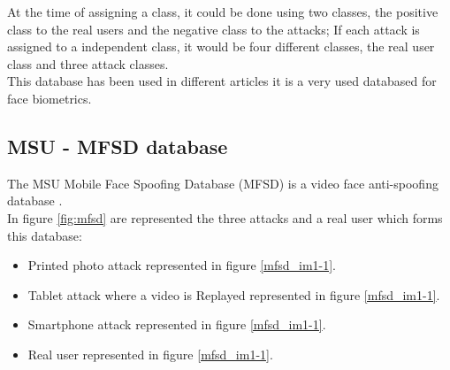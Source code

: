 At the time of assigning a class, it could be done using two classes, the positive class to the real users and the negative class to the attacks; If each attack is assigned to a independent class, it would be four different classes, the real user class and three attack classes.\\



This database has been used in different articles \cite{yangLL14,Spoofing_survey,MSUdatabse,LSTM-CNN} it is a very used databased for face biometrics.\\

\subsection{MSU - MFSD database}
The MSU Mobile Face Spoofing Database (MFSD) is a video face anti-spoofing database \cite{MSUdatabse}.\\

In figure \ref{fig:mfsd} are represented the three attacks and a real user which forms this database:
\begin{itemize}[noitemsep,topsep=8pt,parsep=0pt,partopsep=20pt]
\item Printed photo attack represented in figure \ref{mfsd_im1-1}.
\item Tablet attack where a video is Replayed represented in figure \ref{mfsd_im1-1}.
\item Smartphone attack represented in figure \ref{mfsd_im1-1}.
\item Real user represented in figure \ref{mfsd_im1-1}.
\end{itemize}

